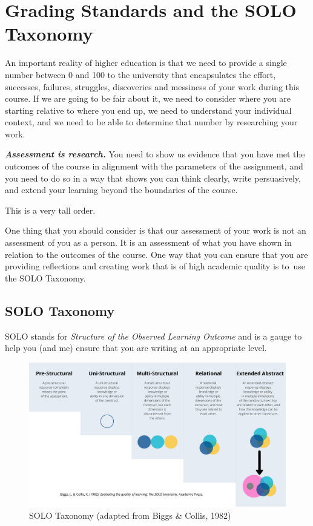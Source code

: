 \documentclass[
]{book}
\begin{document}
\hypertarget{grading-standards-and-the-solo-taxonomy}{%
\section*{Grading Standards and the SOLO Taxonomy}\label{grading-standards-and-the-solo-taxonomy}}

An important reality of higher education is that we need to provide a single number between 0 and 100 to the university that encapsulates the effort, successes, failures, struggles, discoveries and messiness of your work during this course. If we are going to be fair about it, we need to consider where you are starting relative to where you end up, we need to understand your individual context, and we need to be able to determine that number by researching your work.

\textbf{\emph{Assessment is research.}} You need to show us evidence that you have met the outcomes of the course in alignment with the parameters of the assignment, and you need to do so in a way that shows you can think clearly, write persuasively, and extend your learning beyond the boundaries of the course.

This is a very tall order.

One thing that you should consider is that our assessment of your work is not an assessment of you as a person. It is an assessment of what you have shown in relation to the outcomes of the course. One way that you can ensure that you are providing reflections and creating work that is of high academic quality is to~use the SOLO Taxonomy.

\hypertarget{solo-taxonomy}{%
\subsection*{SOLO Taxonomy}\label{solo-taxonomy}}

SOLO stands for \emph{Structure of the Observed Learning Outcome} and is a gauge to help you (and me) ensure that you are writing at an appropriate level.

\begin{figure}
\centering
\includegraphics{assets/SOLO-taxonomy.png}
\caption{SOLO Taxonomy (adapted from Biggs \& Collis, 1982)}
\end{figure}
\end{document}
